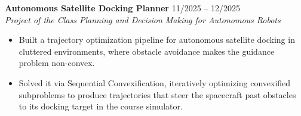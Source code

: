 \documentclass[a4paper,10pt]{article}
\begin{document}
\textbf{Autonomous Satellite Docking Planner}  \hfill 11/2025 -- 12/2025\\
\textit{Project of the Class Planning and Decision Making for Autonomous Robots}
\begin{itemize}
\vspace{-5pt}
    \item Built a trajectory optimization pipeline for autonomous satellite docking in cluttered environments, where obstacle avoidance makes the guidance problem non-convex.
    \item Solved it via Sequential Convexification, iteratively optimizing convexified subproblems to produce trajectories that steer the spacecraft past obstacles to its docking target in the course simulator.
\end{itemize}
\end{document}
